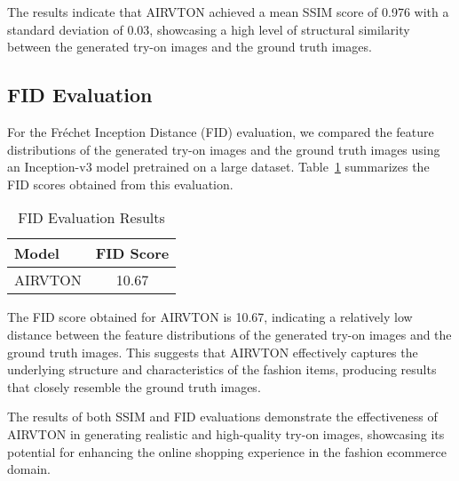 The results indicate that AIRVTON achieved a mean SSIM score of 0.976 with a standard deviation of 0.03, showcasing a high level of structural similarity between the generated try-on images and the ground truth images.

\subsection{FID Evaluation}

For the Fréchet Inception Distance (FID) evaluation, we compared the feature distributions of the generated try-on images and the ground truth images using an Inception-v3 model pretrained on a large dataset. Table~\ref{tab:fid_results} summarizes the FID scores obtained from this evaluation.

\begin{table}[htbp]
  \caption{FID Evaluation Results}
  \label{tab:fid_results}
  \centering
  \begin{tabular}{lc}
    \toprule
    \textbf{Model} & \textbf{FID Score} \\
    \midrule
    AIRVTON & 10.67 \\
    \bottomrule
  \end{tabular}
\end{table}

The FID score obtained for AIRVTON is 10.67, indicating a relatively low distance between the feature distributions of the generated try-on images and the ground truth images. This suggests that AIRVTON effectively captures the underlying structure and characteristics of the fashion items, producing results that closely resemble the ground truth images.

The results of both SSIM and FID evaluations demonstrate the effectiveness of AIRVTON in generating realistic and high-quality try-on images, showcasing its potential for enhancing the online shopping experience in the fashion ecommerce domain.
